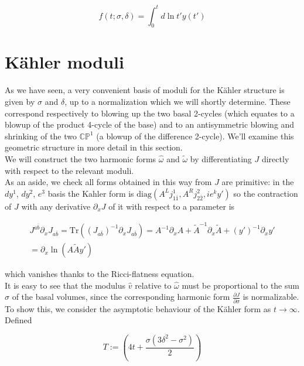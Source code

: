\begin{equation}
	f(t;\sigma,\delta) = \int_0^{t} d\ln t' y(t')
	\label{}
\end{equation}

\section{K\"ahler moduli}

As we have seen, a very convenient basis of moduli for the K\"ahler structure is given by $\sigma$ and $\delta$, up to a normalization which we will shortly determine. These correspond respectively to blowing up the two basal 2-cycles (which equates to a blowup of the product 4-cycle of the base) and to an antisymmetric blowing and shrinking of the two $\mathbb{CP}^1$ (a blowup of the difference 2-cycle). We'll examine this geometric structure in more detail in this section.\\

We will construct the two harmonic forms $\hat\omega$ and $\tilde\omega$ by differentiating $J$ directly with respect to the relevant moduli.\\

As an aside, we check all forms obtained in this way from $J$ are primitive: in the $dy^1$, $dy^2$, $e^3$ basis the Kahler form is $\mathrm{diag}(A^L j^1_{1\bar 1}, A^R j^2_{2\bar 2}, i e^k y')$ so the contraction of $J$ with any derivative $\partial_x J$ of it with respect to a parameter is

\begin{multline}
	J^{a\bar b}\partial_x J_{a\bar b} = \mathrm{Tr}\left( (J_{a\bar b})^{-1} \partial_x J_{a\bar b} \right) = A^{-1} \partial_x A + \tilde A^{-1} \partial_x \tilde A + (y')^{-1} \partial_x y' \\= \partial_x \ln \left( A \tilde A y' \right)	
	\label{}
\end{multline}

which vanishes thanks to the Ricci-flatness equation.\\

It is easy to see that the modulus $\hat v$ relative to $\hat \omega$ must be proportional to the sum $\sigma$ of the basal volumes, since the corresponding harmonic form $\frac{\partial J}{\partial \sigma}$ is normalizable. To show this, we consider the asymptotic behaviour of the K\"ahler form as $t\rightarrow \infty$. Defined

\begin{equation}
	T := \left( 4t + \frac{\sigma(3\delta^2 - \sigma^2)}{2} \right)
	\label{}
\end{equation}

